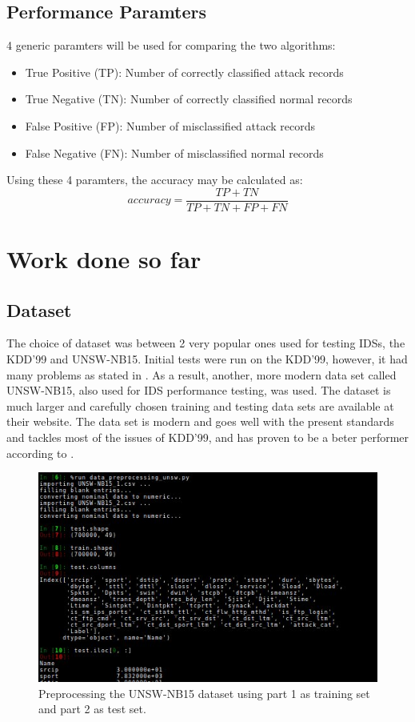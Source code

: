 \documentclass[a4paper,12pt]{article}
\begin{document}
        \subsection{Performance Paramters}
        4 generic paramters will be used for comparing the two algorithms:
        \begin{itemize}
            \item True Positive (TP): Number of correctly classified attack records
            \item True Negative (TN): Number of correctly classified normal records
            \item False Positive (FP): Number of misclassified attack records
            \item False Negative (FN): Number of misclassified normal records
        \end{itemize}
        Using these 4 paramters, the accuracy may be calculated as:
        \begin{equation}
            accuracy = \frac {TP + TN} {TP + TN + FP + FN}
        \end{equation}

	\section{Work done so far}
        \subsection{Dataset}
        The choice of dataset was between 2 very popular ones used for testing IDSs, the KDD'99 and UNSW-NB15. Initial tests were run on the KDD'99, however, it had many problems as stated in \cite{unsw15}. As a result, another, more modern data set called UNSW-NB15, also used for IDS performance testing, was used. The dataset is much larger and carefully chosen training and testing data sets are available at their website. The data set is modern and goes well with the present standards and tackles most of the issues of KDD’99, and has proven to be a beter performer according to \cite{unsw15}.
        \begin{figure}[h!]
            \includegraphics[width=1\textwidth]{preprocessing}
            \caption{Preprocessing the UNSW-NB15 dataset using part 1 as training set and part 2 as test set.}
        \end{figure}
\end{document}
